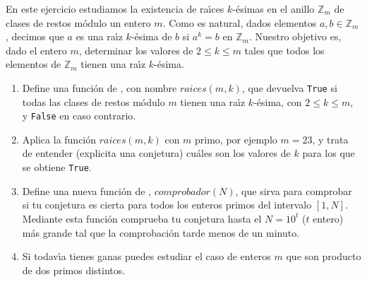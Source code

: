 			
			\begin{ejer}
			En este ejercicio estudiamos la existencia de ra\'{\i}ces $k$-\'esimas en el anillo $\mathbb{Z}_m$ de clases de restos m\'odulo un entero $m$. Como es natural, dados elementos $a,b\in \mathbb{Z}_m$, decimos que $a$ es una ra\'{\i}z $k$-\'esima de $b$ si $a^k=b$ en $\mathbb{Z}_m$. Nuestro objetivo es, dado el entero $m$,  determinar los valores de $2\le k\le m$ tales que todos los elementos de $\mathbb{Z}_m$ tienen una ra\'{\i}z $k$-\'esima.
				\begin{enumerate}
				\item Define una funci\'on de {\sage}, con nombre $raices(m,k)$, que devuelva \lstinline|True| si todas las clases de restos m\'odulo $m$ tienen una ra\'{\i}z $k$-\'esima, con $2\le k\le m$, y \lstinline|False| en caso contrario.
				\item Aplica la funci\'on $raices(m,k)$ con $m$ primo, por ejemplo $m=23$, y trata de entender (explicita una conjetura) cu\'ales son los valores de $k$ para los que se obtiene \lstinline|True|.
				
				\item Define una nueva funci\'on de {\sage}, $comprobador(N)$,  que sirva para comprobar si tu conjetura es cierta para todos los enteros primos del intervalo $[1,N].$ Mediante esta funci\'on comprueba tu conjetura hasta el $N=10^t$ ($t$ entero) m\'as grande tal que la comprobaci\'on tarde menos de un minuto.
				
				\item Si todav\'{\i}a tienes  ganas puedes estudiar el caso de enteros $m$ que son producto de dos primos distintos.
				\end{enumerate}
				
				
				
				\end{ejer}
				
				\begin{ejer}
					
					
					
					
					
					\end{ejer}
		